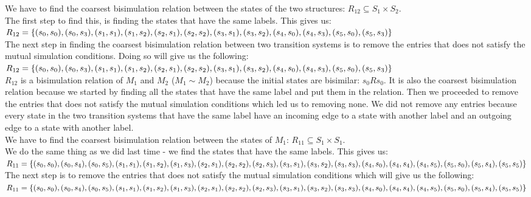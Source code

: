 \documentclass[12pt]{report}
\begin{document}
We have to find the coarsest bisimulation relation between the states of the two structures: $R_{12} \subseteq S_1 \times S_2$.\\
The first step to find this, is finding the states that have the same labels. This gives us:\\
$R_{12} = \{(s_0, s_0), (s_0, s_3), (s_1,s_1), (s_1,s_2),(s_2,s_1),(s_2,s_2),(s_3,s_1),(s_3,s_2),\\
(s_4,s_0),(s_4,s_3),(s_5,s_0),(s_5,s_3)\}$\\
The next step in finding the coarsest bisimulation relation between two transition systems is to remove the entries that does not satisfy the mutual simulation conditions. Doing so will give us the following:\\
$R_{12} = \{(s_0, s_0), (s_0, s_3), (s_1,s_1), (s_1,s_2),(s_2,s_1),(s_2,s_2),(s_3,s_1),(s_3,s_2),\\
(s_4,s_0),(s_4,s_3),(s_5,s_0),(s_5,s_3)\}$\\
$R_{12}$ is a bisimulation relation of $M_1$ and $M_2$ ($M_1 \sim M_2$) because the initial states are bisimilar: $s_0 R s_0$. It is also the coarsest bisimulation relation because we started by finding all the states that have the same label and put them in the relation. Then we proceeded to remove the entries that does not satisfy the mutual simulation conditions which led us to removing none. We did not remove any entries because every state in the two transition systems that have the same label have an incoming edge to a state with another label and an outgoing edge to a state with another label.\\
We have to find the coarsest bisimulation relation between the states of $M_1$: $R_{11} \subseteq S_1 \times S_1$.\\
We do the same thing as we did last time - we find the states that have the same labels. This gives us:\\
$R_{11} = \{(s_0,s_0),(s_0,s_4),(s_0,s_5),(s_1,s_1),(s_1,s_2),(s_1,s_3),(s_2,s_1),(s_2,s_2),\\
(s_2,s_3),(s_3,s_1),(s_3,s_2),(s_3,s_3),(s_4,s_0),(s_4,s_4),(s_4,s_5),(s_5,s_0),(s_5,s_4),\\(s_5,s_5)\}$\\
The next step is to remove the entries that does not satisfy the mutual simulation conditions which will give us the following:\\
$R_{11} = \{(s_0,s_0),(s_0,s_4),(s_0,s_5),(s_1,s_1),(s_1,s_2),(s_1,s_3),(s_2,s_1),(s_2,s_2),\\
(s_2,s_3),(s_3,s_1),(s_3,s_2),(s_3,s_3),(s_4,s_0),(s_4,s_4),(s_4,s_5),(s_5,s_0),(s_5,s_4),\\(s_5,s_5)\}$\\
\end{document}
